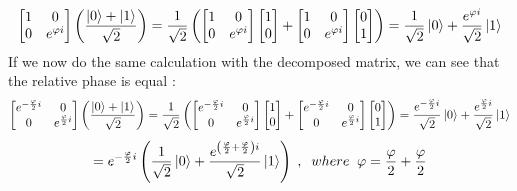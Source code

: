 \documentclass[12pt,a4paper]{article}
\begin{document}
\[
    \begin{bmatrix}
1 & 0 \\
0 & e^{\varphi i}
\end{bmatrix} \left(\frac{\ket{0} + \ket{1}}{\sqrt{2}}\right)
= \frac{1}{\sqrt{2}}\left(
 \begin{bmatrix}
1 & 0 \\
0 & e^{\varphi i}
\end{bmatrix}
 \begin{bmatrix}
1 \\
0 
\end{bmatrix}
+ \begin{bmatrix}
1 & 0 \\
0 & e^{\varphi i}
\end{bmatrix}
 \begin{bmatrix}
0 \\
1 
\end{bmatrix}\right)
= \frac{1}{\sqrt{2}}\ket{0} + \frac{e^{\varphi i}}{\sqrt{2}}\ket{1}
\]
If we now do the same calculation with the decomposed matrix, we can see that the relative phase is equal \cite[p. 248-249]{sutor_dancing_2019}:
\[
    \begin{bmatrix}
e^{-\frac{\varphi}{2} i} & 0 \\
0 & e^{\frac{\varphi}{2} i}
\end{bmatrix} \left(\frac{\ket{0} + \ket{1}}{\sqrt{2}}\right)
= \frac{1}{\sqrt{2}}\left(
 \begin{bmatrix}
e^{-\frac{\varphi}{2} i} & 0 \\
0 & e^{\frac{\varphi}{2} i}
\end{bmatrix}
 \begin{bmatrix}
1 \\
0 
\end{bmatrix}
+ \begin{bmatrix}
e^{-\frac{\varphi}{2} i} & 0 \\
0 & e^{\frac{\varphi}{2} i}
\end{bmatrix}
 \begin{bmatrix}
0 \\
1 
\end{bmatrix}\right)
= \frac{e^{-\frac{\varphi}{2} i}}{\sqrt{2}}\ket{0} + \frac{e^{\frac{\varphi}{2} i}}{\sqrt{2}}\ket{1} 
\]
\[
= e^{-\frac{\varphi}{2} i} \left(\frac{1}{\sqrt{2}}\ket{0} + \frac{e^{\left(\frac{\varphi}{2} + \frac{\varphi}{2}\right) i}}{\sqrt{2}}\ket{1}\right)\;,\;\; where \;\; \varphi = \frac{\varphi}{2}+\frac{\varphi}{2}
\]
\end{document}

